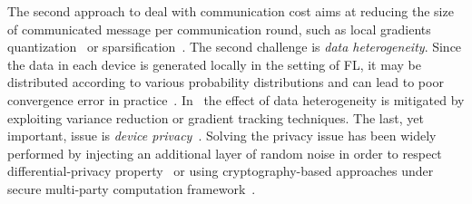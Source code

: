 \documentclass[twoside]{article}
\begin{document}
The second approach to deal with communication cost aims at reducing the size of communicated message per communication round, such as local gradients quantization~\cite{alistarh2017qsgd,bernstein2018signsgd,tang2018communication,wen2017terngrad,wu2018error} or sparsification~\cite{alistarh2018convergence,lin2017deep,stich2018sparsified,stich2019error}.%
The second challenge is \emph{data heterogeneity}. 
Since the data in  each device is generated locally in the setting of FL, it may be distributed according to various probability distributions and can lead to poor convergence error in practice~\cite{li2019federated,liang2019variance}. 
In~\cite{liang2019variance,karimireddy2019scaffold,horvath2019stochastic,haddadpour2020federated} the effect of data heterogeneity is mitigated by exploiting variance reduction or gradient tracking techniques.
The last, yet important, issue is \emph{device privacy}~\cite{geyer2017differentially,hardy2017private}. 
Solving the privacy issue has been widely performed by injecting an additional layer of random noise in order to respect differential-privacy property~\cite{mcmahan2017learning} or using cryptography-based approaches under secure multi-party computation framework~\cite{bonawitz2017practical}.
\end{document}
